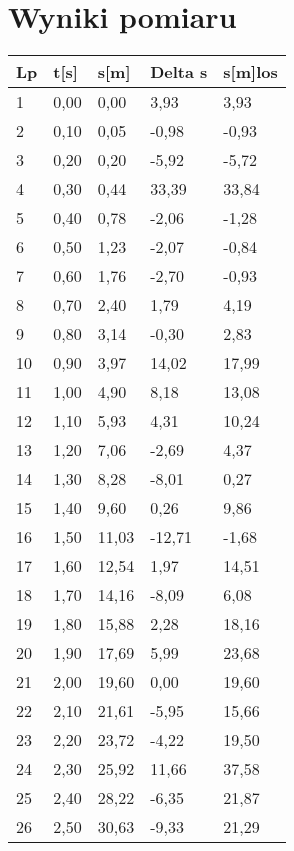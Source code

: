 \documentclass{article}
\begin{document}
\section{Wyniki pomiaru}
\begin{longtable}{|l|l|l|l|l|}
\hline
    Lp & t[s] & s[m] & Delta s & s[m]los \\ \hline
    1 & 0,00 & 0,00 & 3,93 & 3,93 \\ \hline
    2 & 0,10 & 0,05 & -0,98 & -0,93 \\ \hline
    3 & 0,20 & 0,20 & -5,92 & -5,72 \\ \hline
    4 & 0,30 & 0,44 & 33,39 & 33,84 \\ \hline
    5 & 0,40 & 0,78 & -2,06 & -1,28 \\ \hline
    6 & 0,50 & 1,23 & -2,07 & -0,84 \\ \hline
    7 & 0,60 & 1,76 & -2,70 & -0,93 \\ \hline
    8 & 0,70 & 2,40 & 1,79 & 4,19 \\ \hline
    9 & 0,80 & 3,14 & -0,30 & 2,83 \\ \hline
    10 & 0,90 & 3,97 & 14,02 & 17,99 \\ \hline
    11 & 1,00 & 4,90 & 8,18 & 13,08 \\ \hline
    12 & 1,10 & 5,93 & 4,31 & 10,24 \\ \hline
    13 & 1,20 & 7,06 & -2,69 & 4,37 \\ \hline
    14 & 1,30 & 8,28 & -8,01 & 0,27 \\ \hline
    15 & 1,40 & 9,60 & 0,26 & 9,86 \\ \hline
    16 & 1,50 & 11,03 & -12,71 & -1,68 \\ \hline
    17 & 1,60 & 12,54 & 1,97 & 14,51 \\ \hline
    18 & 1,70 & 14,16 & -8,09 & 6,08 \\ \hline
    19 & 1,80 & 15,88 & 2,28 & 18,16 \\ \hline
    20 & 1,90 & 17,69 & 5,99 & 23,68 \\ \hline
    21 & 2,00 & 19,60 & 0,00 & 19,60 \\ \hline
    22 & 2,10 & 21,61 & -5,95 & 15,66 \\ \hline
    23 & 2,20 & 23,72 & -4,22 & 19,50 \\ \hline
    24 & 2,30 & 25,92 & 11,66 & 37,58 \\ \hline
    25 & 2,40 & 28,22 & -6,35 & 21,87 \\ \hline
    26 & 2,50 & 30,63 & -9,33 & 21,29 \\ \hline

\end{longtable}
\end{document}
